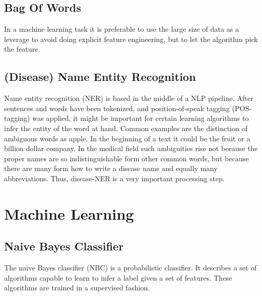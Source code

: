 \subsection{Bag Of Words}
In a machine learning task it is preferable to use the large size of data as a leverage to avoid
doing explicit feature engineering, but to let the algorithm pick the feature.

\subsection{(Disease) Name Entity Recognition}
Name entity recognition (NER) is based in the middle of a NLP pipeline. After
sentences and words have been tokenized, and position-of-speak tagging (POS-
tagging) was applied, it might be important for certain learning algorithms to
infer the entity of the word at hand. Common examples are the distinction of
ambiguous words as apple. In the beginning of a text it could be the fruit or a
billion dollar company.
In the medical field such ambiguities rise not because the proper names are so
indistinguishable form other common words, but because there are many form
how to write a disease name and equally many abbreviations. Thus, disease-NER
is a very important processing step.

\section{Machine Learning}

\subsection{Naive Bayes Classifier}
The naive Bayes classifier (NBC) is a probabilistic classifier. It describes a set
of algorithms capable to learn to infer a label given a set of features. These
algorithms are trained in a supervised fashion.
